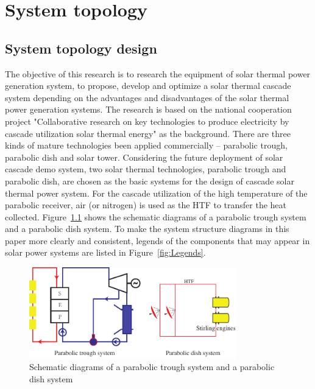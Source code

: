 \chapter{System topology}
\label{cha:SystemTopology}
\section{System topology design}
\label{sec:std}

The objective of this research is to research the equipment of solar thermal power generation system, to propose, develop and optimize a solar thermal cascade system depending on the advantages and disadvantages of the solar thermal power generation systems. 
The research is based on the national cooperation project "Collaborative research on key technologies to produce electricity by cascade utilization solar thermal energy" as the background. 
There are three kinds of mature technologies been applied commercially -- parabolic trough, parabolic dish and solar tower. 
Considering the future deployment of solar cascade demo system, two solar thermal technologies, parabolic trough and parabolic dish, are chosen as the basic systems for the design of cascade solar thermal power system. For the cascade utilization of the high temperature of the parabolic receiver, air (or nitrogen) is used as the HTF to transfer the heat collected.
Figure~\ref{fig:PTPD} shows the schematic diagrams of a parabolic trough system and a parabolic dish system. To make the system structure diagrams in this paper more clearly and consistent, legends of the components that may appear in solar power systems are listed in Figure~\ref{fig:Legends}.

\begin{figure}[!ht]
\centering
\includegraphics[width=0.8\textwidth]{fig/PTPD.pdf}
\caption{Schematic diagrams of a parabolic trough system and a parabolic dish system}\label{fig:PTPD}
\end{figure}

